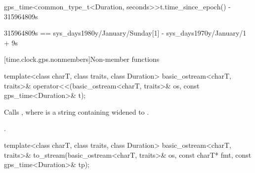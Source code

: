 \begin{itemdescr}
\pnum
\returns
\begin{codeblock}
gps_time<common_type_t<Duration, seconds>>{t.time_since_epoch()} - 315964809s
\end{codeblock}
\begin{note}
\begin{codeblock}
315964809s == sys_days{1980y/January/Sunday[1]} - sys_days{1970y/January/1} + 9s
\end{codeblock}
\end{note}
\end{itemdescr}

[time.clock.gps.nonmembers]{Non-member functions}

%
\begin{itemdecl}
template<class charT, class traits, class Duration>
  basic_ostream<charT, traits>&
    operator<<(basic_ostream<charT, traits>& os, const gps_time<Duration>& t);
\end{itemdecl}

\begin{itemdescr}
\pnum
\effects Calls ,
where  is a string containing
 widened to .

\pnum
\returns {}.
\end{itemdescr}

%
\begin{itemdecl}
template<class charT, class traits, class Duration>
  basic_ostream<charT, traits>&
    to_stream(basic_ostream<charT, traits>& os, const charT* fmt, const gps_time<Duration>& tp);
\end{itemdecl}


